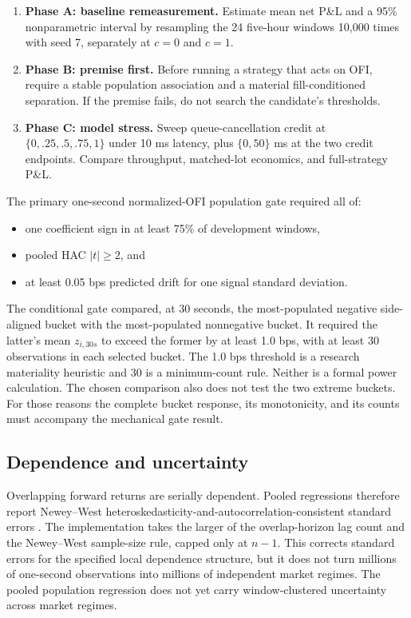 \begin{enumerate}
  \item \textbf{Phase A: baseline remeasurement.} Estimate mean net P\&L and a
        95\% nonparametric interval by resampling the 24 five-hour windows
        10,000 times with seed 7, separately at $c=0$ and $c=1$.
  \item \textbf{Phase B: premise first.} Before running a strategy that acts
        on OFI, require a stable population association and a material
        fill-conditioned separation. If the premise fails, do not search the
        candidate's thresholds.
  \item \textbf{Phase C: model stress.} Sweep queue-cancellation credit at
        $\{0,.25,.5,.75,1\}$ under 10 ms latency, plus $\{0,50\}$ ms at the two
        credit endpoints. Compare throughput, matched-lot economics, and
        full-strategy P\&L.
\end{enumerate}

The primary one-second normalized-OFI population gate required all of:

\begin{itemize}
  \item one coefficient sign in at least 75\% of development windows,
  \item pooled HAC $|t|\ge2$, and
  \item at least 0.05 bps predicted drift for one signal standard deviation.
\end{itemize}

The conditional gate compared, at 30 seconds, the most-populated negative
side-aligned bucket with the most-populated nonnegative bucket. It required
the latter's mean $z_{i,30s}$ to exceed the former by at least 1.0 bps, with at
least 30 observations in each selected bucket. The 1.0 bps threshold is a
research materiality heuristic and 30 is a minimum-count rule. Neither is a
formal power calculation. The chosen comparison also does not test the two
extreme buckets. For those reasons the complete bucket response, its
monotonicity, and its counts must accompany the mechanical gate result.

\subsection{Dependence and uncertainty}

Overlapping forward returns are serially dependent. Pooled regressions
therefore report Newey--West heteroskedasticity-and-autocorrelation-consistent
standard errors \citep{neweywest1987}. The implementation takes the larger of
the overlap-horizon lag count and the Newey--West sample-size rule, capped only
at $n-1$. This corrects standard errors for the specified local dependence
structure, but it does not turn millions of one-second observations into
millions of independent market regimes. The pooled population regression does
not yet carry window-clustered uncertainty across market regimes.

